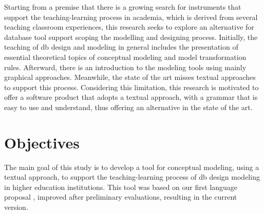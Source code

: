Starting from a premise that there is a growing search for instruments that support the teaching-learning process in academia, which is derived from several teaching classroom experiences, this research seeks to explore an alternative for database tool support scoping the modelling and designing process.
Initially, the teaching of \ac{db} design and modeling in general includes the presentation of essential theoretical topics of conceptual modeling and model transformation rules.
Afterward, there is an introduction to the  modeling tools using %
mainly graphical approaches. Meanwhile, the state of the art misses textual approaches to support this process.
Considering this limitation, this research is motivated to offer a software product that adopts a textual approach, with a grammar that is easy to use and understand, thus offering an alternative in the state of the art.

\section{Objectives}

The main goal of this study is to develop a tool for conceptual modeling, using a textual approach, to support the teaching-learning process of \ac{db} design modeling in higher education institutions.
This tool was based on our first language proposal \cite{Lopes:2019}, improved after preliminary evaluations, resulting in the current version.

